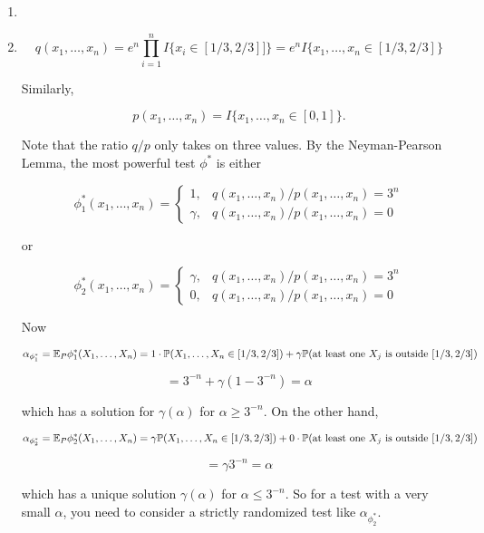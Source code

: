\begin{solution}

\begin{enumerate}

\item

\item

\[
q(x_1, \ldots, x_n) = e^n  \prod_{i=1}^n I \{x_i \in [1/3, 2/3] ]\} = e^n I \{x_1, \ldots, x_n \in [1/3, 2/3]\}
\]

Similarly,

\[
p(x_1, \ldots, x_n) = I \{x_1, \ldots, x_n \in [0,1]\}.
\]

Note that the ratio \(q/p\) only takes on three values. By the Neyman-Pearson Lemma, the most powerful test \(\phi^*\) is either

\[
\phi_1^*(x_1, \ldots, x_n) = \begin{cases}
1, & q(x_1, \ldots, x_n)/p(x_1, \ldots, x_n) = 3^n  \\
\gamma, & q(x_1, \ldots, x_n) /p(x_1, \ldots, x_n) = 0 
\end{cases}
\]

or

\[
\phi_2^*(x_1, \ldots, x_n) = \begin{cases}
\gamma, & q(x_1, \ldots, x_n)/p(x_1, \ldots, x_n) = 3^n  \\
0, & q(x_1, \ldots, x_n) /p(x_1, \ldots, x_n) = 0 
\end{cases}
\]

Now

\[
\alpha_{\phi_1^*} = \E_P \phi_1^* (X_1, \ldots, X_n) = 1 \cdot \mathbb{P}(X_1, \ldots, X_n \in [1/3, 2/3]) + \gamma \mathbb{P}(\text{at least one } X_j \text{ is outside } [1/3, 2/3])
\]

\[
= 3^{-n} + \gamma(1 - 3^{-n}) = \alpha 
\]

which has a solution for \(\gamma(\alpha)\) for \(\alpha \geq 3^{-n}\). On the other hand,

\[
\alpha_{\phi_2^*} = \E_P \phi_2^* (X_1, \ldots, X_n) = \gamma \mathbb{P}(X_1, \ldots, X_n \in [1/3, 2/3]) + 0 \cdot \mathbb{P}(\text{at least one } X_j \text{ is outside } [1/3, 2/3])
\]

\[
= \gamma 3^{-n} = \alpha
\]

which has a unique solution \(\gamma(\alpha)\) for \(\alpha \leq 3^{-n}\). So for a test with a very small \(\alpha\), you need to consider a strictly randomized test like \(\alpha_{\phi_2^*}\). 

\end{enumerate}

\end{solution}


